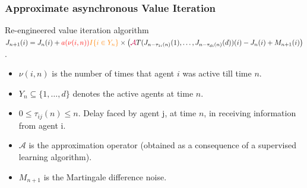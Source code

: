 \documentclass{beamer}
\begin{document}
\begin{frame}
 \frametitle{Approximate asynchronous Value Iteration}
 \begin{block}{Re-engineered value iteration algorithm} {\footnotesize
$J_{n+1}(i) = J_n(i) + {\color{red} a(\nu(i,n))} {\color{orange} I\{i \in Y_n\}} \times
\left( {\color{purple}\mathcal{A}}T (J_{n - \tau_{1i}(n)}(1), \ldots, 
J_{n - \tau_{di}(n)}(d))(i) - J_n(i) + M_{n+1}(i) \right)$.}
\end{block}
\begin{itemize}
\item $\nu(i,n)$ is the number of times that agent $i$ was active till time $n$.
 \item $Y_n \subseteq \{1, \ldots, d\}$ denotes the active agents at time $n$.
 \item $0 \le \tau_{ij}(n) \le n$. Delay faced by {\color{blue}agent j}, at time $n$, in receiving information from 
 {\color{blue}agent i}.
 \item $\mathcal{A}$ is the approximation operator {\color{orange} 
 (obtained as a consequence of a supervised learning algorithm)}.
 \item $M_{n+1}$ is the Martingale difference noise.
\end{itemize}
\end{frame}
\end{document}
